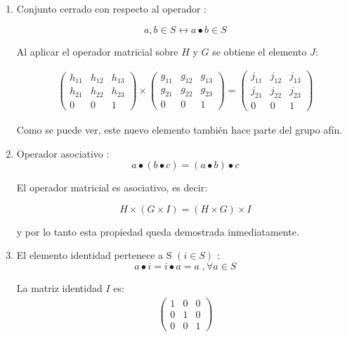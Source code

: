\begin{enumerate}
\item Conjunto cerrado con respecto al operador :

\begin{equation*}
a,b \in S \leftrightarrow a \bullet b \in S
\end{equation*} 

Al aplicar el operador matricial sobre $H$ y $G$ se obtiene el elemento $J$: 

\begin{align}
\begin{pmatrix}
h_{11} & h_{12} & h_{13} \\
h_{21} & h_{22} & h_{23} \\
0 & 0 & 1
\end{pmatrix}
\times
\begin{pmatrix}
g_{11} & g_{12} & g_{13} \\
g_{21} & g_{22} & g_{23} \\
0 & 0 & 1
\end{pmatrix}
=
\begin{pmatrix}
j_{11} & j_{12} & j_{13} \\
j_{21} & j_{22} & j_{23} \\
0 & 0 & 1
\end{pmatrix}
\end{align} 

Como se puede ver, este nuevo elemento también hace parte del grupo afín.

\item Operador asociativo :
\begin{equation*}
a \bullet (b \bullet c) = (a \bullet b) \bullet c
\end{equation*} 

El operador matricial es asociativo, es decir:

\begin{equation*}
H \times (G \times I) = (H \times G) \times I
\end{equation*} 

y por lo tanto esta propiedad queda demostrada inmediatamente.

\item El elemento identidad pertenece a S $(i \in S)$ :
\begin{equation*}
a \bullet i = i \bullet a = a \; , \forall a \in S
\end{equation*} 

La matriz identidad $I$ es:
\begin{align}
\begin{pmatrix}
1 & 0 & 0 \\
0 & 1 & 0 \\
0 & 0 & 1
\end{pmatrix}
\end{align} 


\end{enumerate}
